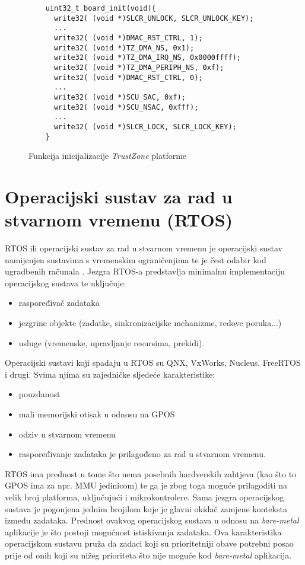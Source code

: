 \documentclass[times, utf8, diplomski, numeric]{fer}
\begin{document}
\begin{figure}[H]
  \lstset{breaklines=true, xleftmargin=.05\textwidth}
  \begin{lstlisting}
    uint32_t board_init(void){
      write32( (void *)SLCR_UNLOCK, SLCR_UNLOCK_KEY);
      ...
      write32( (void *)DMAC_RST_CTRL, 1);
      write32( (void *)TZ_DMA_NS, 0x1);
      write32( (void *)TZ_DMA_IRQ_NS, 0x0000ffff);
      write32( (void *)TZ_DMA_PERIPH_NS, 0xf);
      write32( (void *)DMAC_RST_CTRL, 0);
      ...
      write32( (void *)SCU_SAC, 0xf);
      write32( (void *)SCU_NSAC, 0xfff);
      ...
      write32( (void *)SLCR_LOCK, SLCR_LOCK_KEY);
    }
  \end{lstlisting}
  \caption{Funkcija inicijalizacije \textit{TrustZone} platforme}
  \label{tz_init}
\end{figure}

\chapter{Operacijski sustav za rad u stvarnom vremenu (RTOS)}
RTOS ili operacijski sustav za rad u stvarnom vremenu je operacijski sustav namijenjen sustavima s vremenskim ograničenjima
te je čest odabir kod ugradbenih računala \cite{ppius}. Jezgra RTOS-a predstavlja minimalnu implementaciju operacijskog
sustava te uključuje:
\begin{itemize}
  \item {raspoređivač zadataka}
  \item{jezgrine objekte (zadatke, sinkronizacijske mehanizme, redove poruka...)}
  \item{usluge (vremenske, upravljanje resursima, prekidi).}
\end{itemize}
Operacijski sustavi koji spadaju u RTOS su QNX, VxWorks, Nucleus, FreeRTOS i drugi. Svima njima su zajedničke sljedeće
karakteristike:
\begin{itemize}
  \item {pouzdanost}
  \item{mali memorijski otisak u odnosu na GPOS}
  \item{odziv u stvarnom vremenu}
  \item{raspoređivanje zadataka je prilagođeno za rad u stvarnom vremenu.}
\end{itemize}
RTOS ima prednost u tome što nema posebnih hardverskih zahtjeva (kao što to GPOS ima za npr. MMU jedinicom) te ga je zbog toga
moguće prilagoditi na velik broj platforma, uključujući i mikrokontrolere. Sama jezgra operacijskog sustava je pogonjena jednim
brojilom koje je glavni okidač zamjene konteksta između zadataka. Prednost ovakvog operacijskog sustava u odnosu na
\textit{bare-metal} aplikacije je što postoji mogućnost istiskivanja zadataka. Ova karakteristika operacijskom sustavu
pruža da zadaci koji su prioritetniji obave potrebni posao prije od onih koji su nižeg prioriteta što nije moguće kod
\textit{bare-metal} aplikacija.
\end{document}
